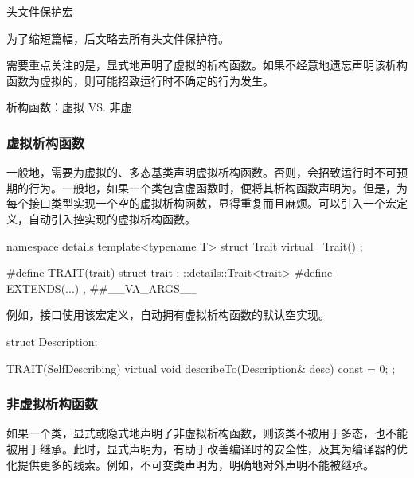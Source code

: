 \begin{content}
\begin{episode}{头文件保护宏}
\begin{content}
为了缩短篇幅，后文略去所有头文件保护符。

\end{content}

\end{episode}

需要重点关注的是，显式地声明了虚拟的析构函数。如果不经意地遗忘声明该析构函数为虚拟的，则可能招致运行时不确定的行为发生。

\begin{episode}{析构函数：虚拟 VS. 非虚}

\begin{content}

\subsubsection{虚拟析构函数}

一般地，需要为虚拟的、多态基类声明虚拟析构函数。否则，会招致运行时不可预期的行为。一般地，如果一个类包含虚函数时，便将其析构函数声明为。但是，为每个接口类型实现一个空的虚拟析构函数，显得重复而且麻烦。可以引入一个宏定义，自动引入控实现的虚拟析构函数。

\begin{leftbar}
 \begin{c++}[caption={\ttfamily{include/mars/core/Test.h}}]
namespace details {
  template<typename T>
  struct Trait {
    virtual ~Trait() {}
  };
}

#define TRAIT(trait)  struct trait : ::details::Trait<trait>
#define EXTENDS(...) , ##__VA_ARGS__
 \end{c++}
\end{leftbar}

例如，接口使用该宏定义，自动拥有虚拟析构函数的默认空实现。

\begin{leftbar}
 \begin{c++}
struct Description;

TRAIT(SelfDescribing) {
  virtual void describeTo(Description& desc) const = 0;
};
 \end{c++}
\end{leftbar}

\subsubsection{非虚拟析构函数}

如果一个类，显式或隐式地声明了非虚拟析构函数，则该类不被用于多态，也不能被用于继承。此时，显式声明为，有助于改善编译时的安全性，及其为编译器的优化提供更多的线索。例如，不可变类声明为，明确地对外声明不能被继承。


\end{content}
\end{episode}
\end{content}

